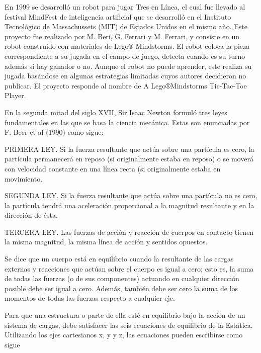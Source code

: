  En 1999 se desarrolló un robot para jugar Tres en Línea, el cual fue llevado al 
festival MindFest de inteligencia artificial que se desarrolló en el Instituto 
Tecnológico de Massachussets (MIT) de Estados Unidos en el mismo año. Este 
proyecto fue realizado por M. Beri, G. Ferrari y M. Ferrari, y consiste en un robot 
construido con materiales de Lego® Mindstorms. El robot coloca la pieza 
correspondiente a su jugada en el campo de juego, detecta cuando es su turno además 
sí hay ganador o no. Aunque el robot no puede aprender, este realiza su jugada 
basándose en algunas estrategias limitadas cuyos autores decidieron no publicar. El 
proyecto responde al nombre de A Lego®Mindstorms Tic-Tac-Toe Player. 



	
		En la segunda mitad del siglo XVII, Sir Isaac Newton formuló tres leyes 
		fundamentales en las que se basa la ciencia mecánica. Estas son enunciadas por F. 
		Beer et al (1990) como sigue: 
		\begin{enumeracion}
		\item PRIMERA LEY. Si la fuerza resultante que actúa sobre una partícula es cero, la 
		partícula permanecerá en reposo (si originalmente estaba en reposo) o se moverá 
		con velocidad constante en una línea recta (si originalmente estaba en 
		movimiento. 
		\item SEGUNDA LEY. Si la fuerza resultante que actúa sobre una partícula no es cero, 
		la partícula tendrá una aceleración proporcional a la magnitud resultante y en la 
		dirección de ésta. 
		\item TERCERA LEY. Las fuerzas de acción y reacción de cuerpos en contacto tienen 
		la misma magnitud, la misma línea de acción y sentidos opuestos. 
		\end{enumeracion}
	
	
		 Se dice que un cuerpo está en equilibrio cuando la resultante de las cargas 
		externas y reacciones que actúan sobre el cuerpo es igual a cero; esto es, la suma de 
		todas las fuerzas (o de sus componentes) actuando en cualquier dirección posible 
		debe ser igual a cero. Además, también debe ser cero la suma de los momentos de 
		todas las fuerzas respecto a cualquier eje. 
		
		 Para que una estructura o parte de ella esté en equilibrio bajo la acción de un 
		sistema de cargas, debe satisfacer las seis ecuaciones de equilibrio de la Estática. 
		Utilizando los ejes cartesianos x, y y z, las ecuaciones pueden escribirse como sigue
		
